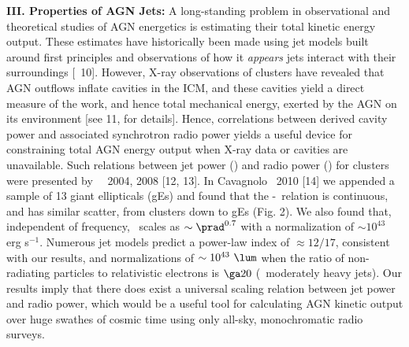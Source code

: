 \documentclass[letterpaper,11pt]{article}
\begin{document}
{\bf{III. Properties of AGN Jets:}} A long-standing problem in
observational and theoretical studies of AGN energetics is estimating
their total kinetic energy output. These estimates have historically
been made using jet models built around first principles and
observations of how it {\it{appears}} jets interact with their
surroundings [\eg\ 10]. However, X-ray observations of clusters have
revealed that AGN outflows inflate cavities in the ICM, and these
cavities yield a direct measure of the work, and hence total
mechanical energy, exerted by the AGN on its environment [see 11, for
  details]. Hence, correlations between derived cavity power and
associated synchrotron radio power yields a useful device for
constraining total AGN energy output when X-ray data or cavities are
unavailable. Such relations between jet power (\pjet) and radio power
(\prad) for clusters were presented by \birzan\ \etal\ 2004, 2008 [12,
  13]. In Cavagnolo \etal\ 2010 [14] we appended a sample of 13 giant
ellipticals (gEs) and found that the \pjet-\prad\ relation is
continuous, and has similar scatter, from clusters down to gEs
(Fig. 2). We also found that, independent of frequency, \pjet\ scales
as $\sim \prad^{0.7}$ with a normalization of $\sim 10^{43}$ erg
s$^{-1}$. Numerous jet models predict a power-law index of $\approx
12/17$, consistent with our results, and normalizations of $\sim
10^{43} ~\lum$ when the ratio of non-radiating particles to
relativistic electrons is $\ga 20$ (\ie\ moderately heavy jets). Our
results imply that there does exist a universal scaling relation
between jet power and radio power, which would be a useful tool for
calculating AGN kinetic output over huge swathes of cosmic time using
only all-sky, monochromatic radio surveys.
\end{document}
